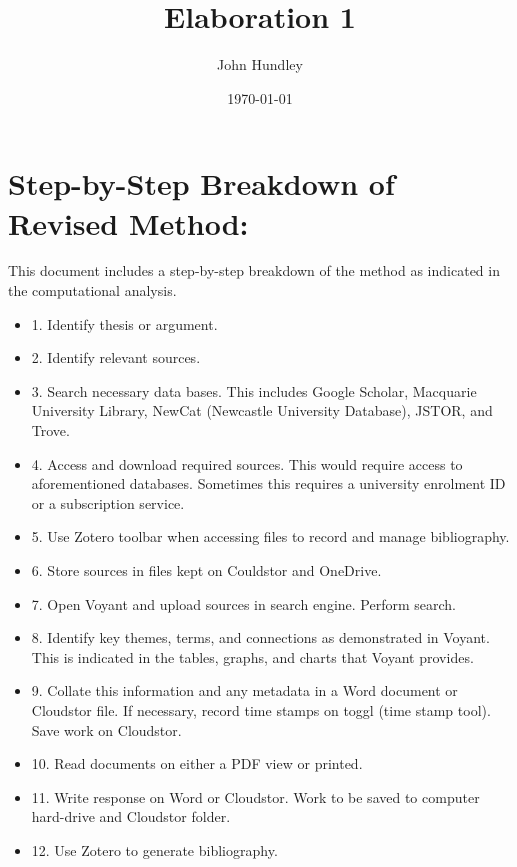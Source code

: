 \documentclass[a4paper,12pt]{article}
\title{Elaboration 1}
\author{John Hundley}
\date{\today}
\begin{document}
\maketitle

\section{Step-by-Step Breakdown of Revised Method:}

This document includes a step-by-step breakdown of the method as indicated in the computational analysis.

\begin{itemize} 

\item 1.	Identify thesis or argument. 
\item 2.	Identify relevant sources. 
\item 3.	Search necessary data bases. This includes Google Scholar, Macquarie University Library, NewCat (Newcastle University Database), JSTOR, and Trove. 
\item 4.	Access and download required sources. This would require access to aforementioned databases. Sometimes this requires a university enrolment ID or a subscription service. 
\item 5.	Use Zotero toolbar when accessing files to record and manage bibliography.
\item 6.	Store sources in files kept on Couldstor and OneDrive. 
\item 7.	Open Voyant and upload sources in search engine. Perform search. 
\item 8.	Identify key themes, terms, and connections as demonstrated in Voyant. This is indicated in the tables, graphs, and charts that Voyant provides. 
\item 9.	Collate this information and any metadata in a Word document or Cloudstor file. If necessary, record time stamps on toggl (time stamp tool). Save work on Cloudstor. 
\item 10.	Read documents on either a PDF view or printed.
\item 11.	Write response on Word or Cloudstor. Work to be saved to computer hard-drive and Cloudstor folder. 
\item 12.	Use Zotero to generate bibliography. 

\end{itemize}
\end{document}
